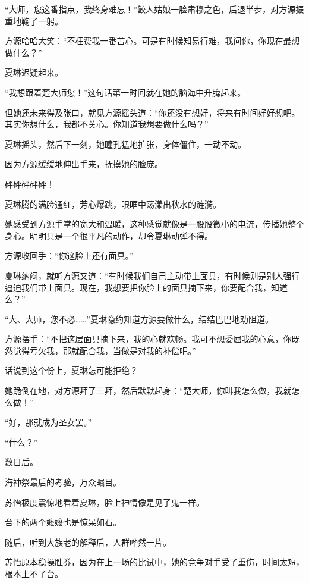 
\begin{this_body}



“大师，您这番指点，我终身难忘！”鲛人姑娘一脸肃穆之色，后退半步，对方源振重地鞠了一躬。

方源哈哈大笑：“不枉费我一番苦心。可是有时候知易行难，我问你，你现在最想做什么？”

夏琳迟疑起来。

“我想跟着楚大师您！”这句话第一时间就在她的脑海中升腾起来。

但她还未来得及张口，就见方源摇头道：“你还没有想好，将来有时间好好想吧。其实你想什么，我都不关心。你知道我想要做什么吗？”

夏琳摇头，然后下一刻，她瞳孔猛地扩张，身体僵住，一动不动。

因为方源缓缓地伸出手来，抚摸她的脸庞。

砰砰砰砰砰！

夏琳腾的满脸通红，芳心爆跳，眼眶中荡漾出秋水的涟漪。

她感受到方源手掌的宽大和温暖，这种感觉就像是一股股微小的电流，传播她整个身心。明明只是一个很平凡的动作，却令夏琳动弹不得。

方源收回手：“你这脸上还有面具。”

夏琳纳闷，就听方源又道：“有时候我们自己主动带上面具，有时候则是别人强行逼迫我们带上面具。现在，我想要把你脸上的面具摘下来，你要配合我，知道么？”

“大、大师，您不必……”夏琳隐约知道方源要做什么，结结巴巴地劝阻道。

方源摆手：“不把这层面具摘下来，我的心就欢畅。我可不想委屈我的心意，你既然觉得亏欠我，那就配合我，当做是对我的补偿吧。”

话说到这个份上，夏琳怎可能拒绝？

她跪倒在地，对方源拜了三拜，然后默默起身：“楚大师，你叫我怎么做，我就怎么做！”

“好，那就成为圣女罢。”

“什么？”

数日后。

海神祭最后的考验，万众瞩目。

苏怡极度震惊地看着夏琳，脸上神情像是见了鬼一样。

台下的两个嬷嬷也是惊呆如石。

随后，听到大族老的解释后，人群哗然一片。

苏怡原本稳操胜券，因为在上一场的比试中，她的竞争对手受了重伤，时间太短，根本上不了台。


\end{this_body}
